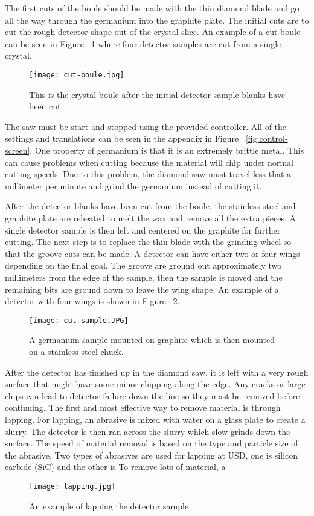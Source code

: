 The first cuts of the boule should be made with the thin diamond blade and go all the way through the germanium into the graphite plate.
The initial cuts are to cut the rough detector shape out of the crystal slice.
An example of a cut boule can be seen in Figure ~\ref{fig:cutboule} where four detector samples are cut from a single crystal.
\begin{figure}[htpb]
\centering
\texttt{[image: cut-boule.jpg]}
\caption{This is the crystal boule after the initial detector sample blanks have been cut.}
\label{fig:cutboule}
\end{figure}
The saw must be start and stopped using the provided controller.
All of the settings and translations can be seen in the appendix in Figure ~\ref{fig:control-screen}.
One property of germanium is that it is an extremely brittle metal.
This can cause problems when cutting because the material will chip under normal cutting speeds.
Due to this problem, the diamond saw must travel less that a millimeter per minute and grind the germanium instead of cutting it.

After the detector blanks have been cut from the boule, the stainless steel and graphite plate are reheated to melt the wax and remove all the extra pieces.
A single detector sample is then left and centered on the graphite for further cutting.
The next step is to replace the thin blade with the grinding wheel so that the groove cuts can be made.
A detector can have either two or four wings depending on the final goal.
The groove are ground out approximately two millimeters from the edge of the sample, then the sample is moved and the remaining bits are ground down to leave the wing shape.
An example of a detector with four wings is shown in Figure ~\ref{fig:cut-sample}.
\begin{figure}[htpb]
\centering
\texttt{[image: cut-sample.JPG]}
\caption{A germanium sample mounted on graphite which is then mounted on a stainless steel chuck.}
\label{fig:cut-sample}
\end{figure}

After the detector has finished up in the diamond saw, it is left with a very rough surface that might have some minor chipping along the edge.
Any cracks or large chips can lead to detector failure down the line so they must be removed before continuing.
The first and most effective way to remove material is through lapping.
For lapping, an abrasive is mixed with water on a glass plate to create a slurry.
The detector is then ran across the slurry which slow grinds down the surface.
The speed of material removal is based on the type and particle size of the abrasive.
Two types of abrasives are used for lapping at USD, one is silicon carbide (SiC) and the other is 
To remove lots of material, a  
\begin{figure}[htpb]
\centering
\texttt{[image: lapping.jpg]}
\caption{An example of lapping the detector sample}
\label{fig:lapping}
\end{figure}%
